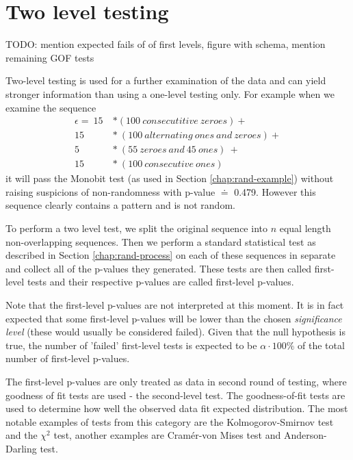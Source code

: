\documentclass[
  digital,     %
  oneside,     %
  nosansbold,  %
  nocolorbold, %
  nolof,         %
  nolot,         %
]{fithesis4}
\begin{document}
 



\section{Two level testing} \label{chap:rand-two_level}

TODO: mention expected fails of of first levels, figure with schema, mention remaining GOF tests


Two-level testing is used for a further examination of the data and can yield stronger information than using a one-level testing only. For example when we examine the sequence 
\[\begin{split}
    \epsilon =\:15\: &* (100\:consecutitive\:zeroes) + \\
    15\:&*\:(100\:alternating\:ones\:and\:zeroes) + \\
    5\:&*\:(55\:zeroes\:and\:45\:ones)\:+\:\\
    15\:&*\:(100\:consecutive\:ones)
\end{split}\]
it will pass the Monobit test (as used in Section \ref{chap:rand-example}) without raising suspicions of non-randomness with p-value $\doteq$ 0.479. However this sequence clearly contains a pattern and is not random. 

To perform a two level test, we split the original sequence into $n$ equal length non-overlapping sequences. Then we perform a standard statistical test as described in Section \ref{chap:rand-process} on each of these sequences in separate and collect all of the p-values they generated. These tests are then called first-level tests and their respective p-values are called first-level p-values. 

Note that the first-level p-values are not interpreted at this moment. It is in fact expected that some first-level p-values will be lower than the chosen \emph{significance level} (these would usually be considered failed). Given that the null hypothesis is true, the number of 'failed' first-level tests is expected to be $\alpha\cdot100\%$ of the total number of first-level p-values.

The first-level p-values are only treated as data in second round of testing, where goodness of fit tests are used - the second-level test. The goodness-of-fit tests are used to determine how well the observed data fit expected distribution. The most notable examples of tests from this category are the Kolmogorov-Smirnov test and the $\chi^2$ test, another examples are Cramér-von Mises test and Anderson-Darling test. 
\end{document}

